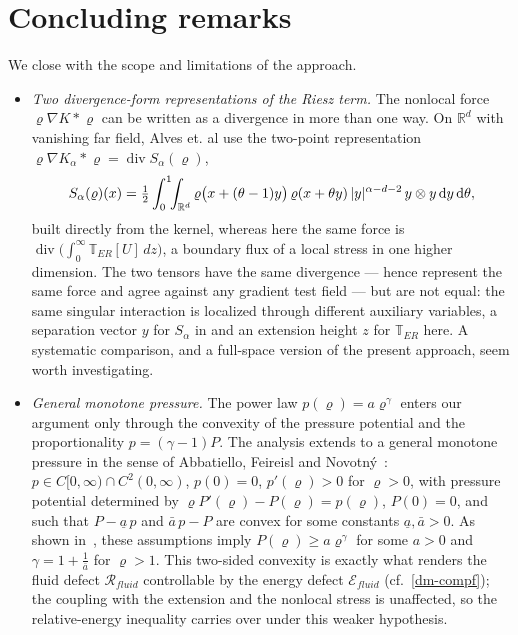 \documentclass[12pt,a4paper,twoside]{article}
\newcommand{\Div}{\operatorname{div}}
\newcommand{\vr}{\varrho}
\newcommand{\dd}{\delta}
\numberwithin{equation}{section}%
\renewcommand{\dd}{{\rm d}}
\begin{document}
\section*{Concluding remarks}

We close with the scope and limitations of the approach.
\begin{itemize}[leftmargin=*]
	\item \emph{Two divergence-form representations of the Riesz term.} The nonlocal force
	$\varrho\nabla K*\varrho$ can be written as a divergence in more than one way. On $\mathbb R^d$ with
	vanishing far field, Alves et. al \cite[Eq. 1-4]{AlGT2026} use the two-point representation
	$\varrho\nabla K_\alpha*\varrho=\Div S_\alpha(\varrho)$,
	\[
	S_\alpha(\varrho)(x)=\tfrac12\int_0^1\!\!\int_{\mathbb R^d}
	\varrho\big(x+(\theta-1)y\big)\,\varrho(x+\theta y)\,|y|^{\alpha-d-2}\,y\otimes y\,\dd y\,\dd\theta,
	\]
	built directly from the kernel, whereas here the same force is $\Div\!\big(\int_0^\infty
	\mathbb T_{ER}[U]\,dz\big)$, a boundary flux of a local stress in one higher dimension. The two
	tensors have the same divergence --- hence represent the same force and agree against any gradient
	test field --- but are not equal: the same singular interaction is localized through different
	auxiliary variables, a separation vector $y$ for $S_\alpha$ in \cite{AlGT2026} and an extension
	height $z$ for $\mathbb T_{ER}$ here. A systematic comparison, and a full-space version of the
	present approach, seem worth investigating.
	\item \emph{General monotone pressure.} The power law $p(\vr)=a\vr^\gamma$ enters our
	argument only through the convexity of the pressure potential and the proportionality
	$p=(\gamma-1)P$. The analysis extends to a general monotone pressure in the sense of
	Abbatiello, Feireisl and Novotn\'y~\cite{AFN2021}: $p\in C[0,\infty)\cap C^2(0,\infty)$,
	$p(0)=0$, $p'(\vr)>0$ for $\vr>0$, with pressure potential determined by
	$\vr P'(\vr)-P(\vr)=p(\vr)$, $P(0)=0$, and such that $P-\underline a\,p$ and
	$\bar a\,p-P$ are convex for some constants $\underline a,\bar a>0$. As shown in~\cite{AFN2021}, these assumptions imply $P(\vr)\geq a \vr^\gamma$ for some $a>0$ and $\gamma=1+\frac{1}{\bar{a}}$ for $\vr>1$. This two-sided convexity
	is exactly what renders the fluid defect $\mathcal R_{fluid}$ controllable by the energy
	defect $\mathcal E_{fluid}$ (cf.\ \eqref{dm-compf}); the coupling with the extension and the
	nonlocal stress is unaffected, so the relative-energy inequality carries over under this
	weaker hypothesis.
	

\end{itemize}
\end{document}
